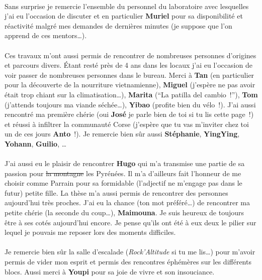 \paragraph{} %
Sans surprise je remercie l’ensemble du personnel du laboratoire avec lesquelles j’ai
eu l’occasion de discuter et en particulier \textbf{Muriel} pour sa disponibilité et
réactivité malgré mes demandes de dernières minutes (je suppose que l’on apprend de
ces mentors\dots).
\paragraph{} %
Ces travaux m’ont aussi permis de rencontrer de nombreuses personnes d’origines et
parcours divers. Étant resté près de \num{4} ans dans les locaux j’ai eu l’occasion
de voir passer de nombreuses personnes dans le bureau. Merci à \textbf{Tan} (en particulier pour
la découverte de la nourriture vietnamienne), \textbf{Miguel} (j’espère
ne pas avoir était trop chiant sur la climatisation\dots), \textbf{Marita} (\enquote{La patilla del cambio~!}),
\textbf{Tom} (j’attends toujours ma viande séchée\dots), \textbf{Yibao} (profite bien du vélo~!). J’ai aussi rencontré
ma première chérie (oui \textbf{José} je parle bien de toi si tu lis cette page~!) et réussi
à infiltrer la communauté Corse (j’espère que tu vas m’inviter chez toi un de ces jours
\textbf{Anto}~!). Je remercie bien sûr aussi \textbf{Stéphanie}, \textbf{YingYing},
\textbf{Yohann}, \textbf{Guilio}, \dots

\paragraph{} %
J’ai aussi eu le plaisir de rencontrer \textbf{Hugo} qui m’a transmise une partie
de sa passion pour \st{la montagne} les Pyrénées. Il m’a d’ailleurs fait l’honneur
de me choisir comme Parrain pour sa formidable (l’adjectif ne m’engage pas dans le futur)
petite fille.
La thèse m’a aussi permis de rencontrer des personnes aujourd’hui très proches.
J’ai eu la chance (ton mot préféré\dots) de rencontrer ma petite chérie (la seconde
du coup\dots), \textbf{Maimouna}. Je suis heureux de toujours être à ses cotés aujourd’hui encore.
Je pense qu’ils ont été à eux deux le pilier sur lequel je pouvais me reposer lors
des moments difficiles.

\paragraph{} %
Je remercie bien sûr la salle d’escalade (\emph{Rock’Altitude} si tu me lis\dots) pour
m’avoir permis de vider mon esprit et permis des rencontres éphémères sur les différents
blocs. Aussi merci à \textbf{Youpi} pour sa joie de vivre et son insouciance.


